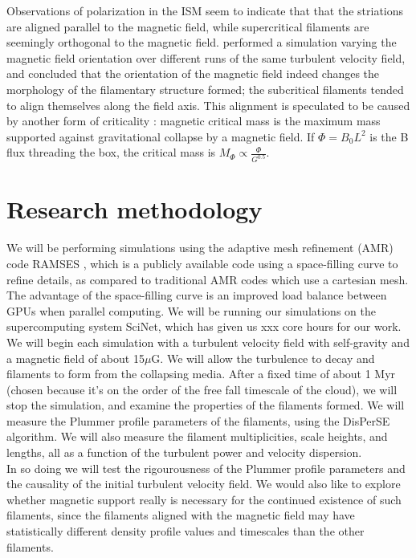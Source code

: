 \documentclass[a4paper,12pt]{article}
\begin{document}
Observations of polarization in the ISM seem to indicate that that the striations are aligned parallel to the magnetic field, while supercritical filaments are seemingly orthogonal to the magnetic field. \cite{soler13} performed a simulation varying the magnetic field orientation over different runs of the same turbulent velocity field, and concluded that the orientation of the magnetic field indeed changes the morphology of the filamentary structure formed; the subcritical filaments tended to align themselves along the field axis. This alignment is speculated to be caused by another form of criticality \citep{mkk14}: magnetic critical mass is the maximum mass supported against gravitational collapse by a magnetic field. If $\Phi = B_0L^2$ is the B flux threading the box, the critical mass is $M_\Phi \propto \frac{\Phi}{G^{0.5}}$. 

\section{Research methodology} %

We will be performing simulations using the adaptive mesh refinement (AMR) code RAMSES \citep{tey02}, which is a publicly available code using a space-filling curve to refine details, as compared to traditional AMR codes which use a cartesian mesh. The advantage of the space-filling curve is an improved load balance between GPUs when parallel computing. We will be running our simulations on the supercomputing system SciNet, which has given us xxx core hours for our work.\\

We will begin each simulation with a turbulent velocity field with self-gravity and a magnetic field of about 15$\mu$G. We will allow the turbulence to decay and filaments to form from the collapsing media. After a fixed time of about 1 Myr (chosen because it's on the order of the free fall timescale of the cloud), we will stop the simulation, and examine the properties of the filaments formed. We will measure the Plummer profile parameters of the filaments, using the DisPerSE algorithm. We will also measure the filament multiplicities, scale heights, and lengths, all as a function of the turbulent power and velocity dispersion.\\

In so doing we will test the rigourousness of the Plummer profile parameters and the causality of the initial turbulent velocity field. We would also like to explore whether magnetic support really is necessary for the continued existence of such filaments, since the filaments aligned with the magnetic field may have statistically different density profile values and timescales than the other filaments.\\



\end{document}
